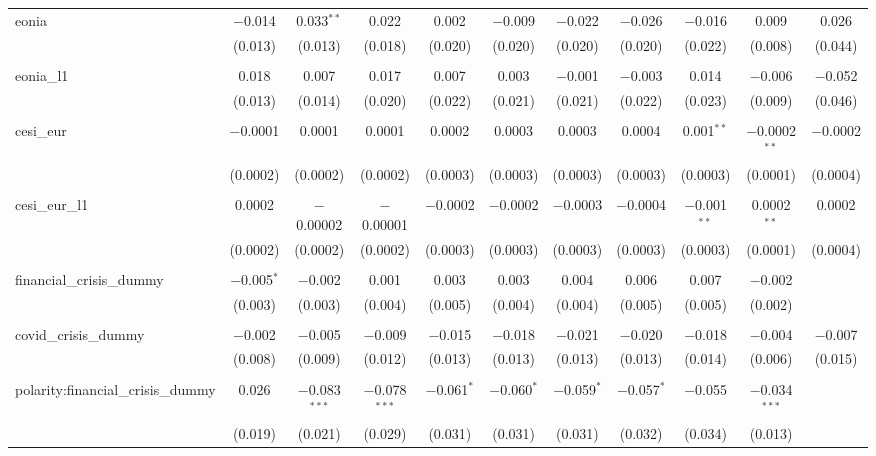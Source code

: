 \begin{table}[!htbp]
\begin{adjustbox}{width=1.25\textwidth}
\begin{tabular}{@{\extracolsep{5pt}}lcccccccccc}
 eonia & $-$0.014 & 0.033$^{**}$ & 0.022 & 0.002 & $-$0.009 & $-$0.022 & $-$0.026 & $-$0.016 & 0.009 & 0.026 \\ 
  & (0.013) & (0.013) & (0.018) & (0.020) & (0.020) & (0.020) & (0.020) & (0.022) & (0.008) & (0.044) \\ 
  & & & & & & & & & & \\ 
 eonia\_l1 & 0.018 & 0.007 & 0.017 & 0.007 & 0.003 & $-$0.001 & $-$0.003 & 0.014 & $-$0.006 & $-$0.052 \\ 
  & (0.013) & (0.014) & (0.020) & (0.022) & (0.021) & (0.021) & (0.022) & (0.023) & (0.009) & (0.046) \\ 
  & & & & & & & & & & \\ 
 cesi\_eur & $-$0.0001 & 0.0001 & 0.0001 & 0.0002 & 0.0003 & 0.0003 & 0.0004 & 0.001$^{**}$ & $-$0.0002$^{**}$ & $-$0.0002 \\ 
  & (0.0002) & (0.0002) & (0.0002) & (0.0003) & (0.0003) & (0.0003) & (0.0003) & (0.0003) & (0.0001) & (0.0004) \\ 
  & & & & & & & & & & \\ 
 cesi\_eur\_l1 & 0.0002 & $-$0.00002 & $-$0.00001 & $-$0.0002 & $-$0.0002 & $-$0.0003 & $-$0.0004 & $-$0.001$^{**}$ & 0.0002$^{**}$ & 0.0002 \\ 
  & (0.0002) & (0.0002) & (0.0002) & (0.0003) & (0.0003) & (0.0003) & (0.0003) & (0.0003) & (0.0001) & (0.0004) \\ 
  & & & & & & & & & & \\ 
 financial\_crisis\_dummy & $-$0.005$^{*}$ & $-$0.002 & 0.001 & 0.003 & 0.003 & 0.004 & 0.006 & 0.007 & $-$0.002 &  \\ 
  & (0.003) & (0.003) & (0.004) & (0.005) & (0.004) & (0.004) & (0.005) & (0.005) & (0.002) &  \\ 
  & & & & & & & & & & \\ 
 covid\_crisis\_dummy & $-$0.002 & $-$0.005 & $-$0.009 & $-$0.015 & $-$0.018 & $-$0.021 & $-$0.020 & $-$0.018 & $-$0.004 & $-$0.007 \\ 
  & (0.008) & (0.009) & (0.012) & (0.013) & (0.013) & (0.013) & (0.013) & (0.014) & (0.006) & (0.015) \\ 
  & & & & & & & & & & \\ 
 polarity:financial\_crisis\_dummy & 0.026 & $-$0.083$^{***}$ & $-$0.078$^{***}$ & $-$0.061$^{*}$ & $-$0.060$^{*}$ & $-$0.059$^{*}$ & $-$0.057$^{*}$ & $-$0.055 & $-$0.034$^{***}$ &  \\ 
  & (0.019) & (0.021) & (0.029) & (0.031) & (0.031) & (0.031) & (0.032) & (0.034) & (0.013) &  \\ 

\end{tabular}
\end{adjustbox}
\end{table}
